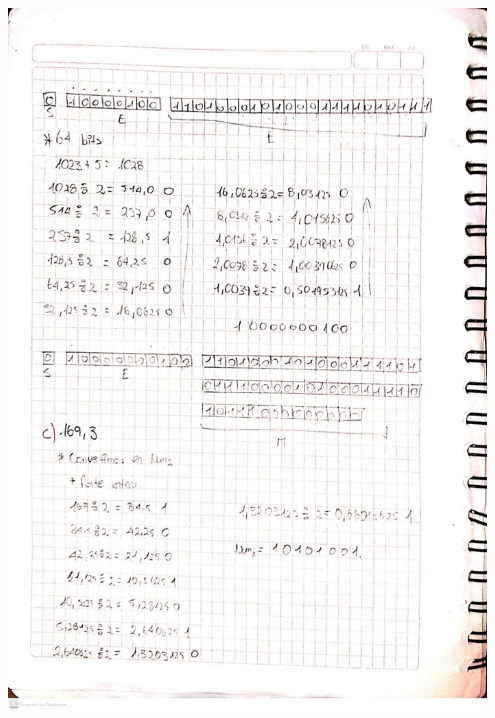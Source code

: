 \documentclass[12pt]{article}
\begin{document}
\begin{minipage}{0.95\textwidth}
    \raggedleft
    \includegraphics[width=0.95\textwidth]{inFiles/Figures/ej4.jpeg}
\end{minipage}

\vspace{0.5cm}
\end{document}
